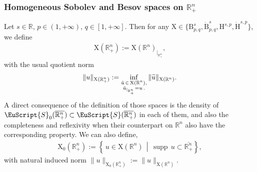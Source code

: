 \documentclass[AHL,Unicode,longabstracts,published]{cedram}
\DeclareMathOperator{\supp}{supp\,}
\newcommand{\bbR}{\mathbb{R}}
\newcommand{\rmH}{\mathrm{H}}%
\newcommand{\rmB}{\mathrm{B}}
\newcommand{\rmX}{\mathrm{X}}
\newcommand{\eus}{\EuScript}
\let\oldtilde\tilde
\renewcommand*{\tilde}[1]{\mathchoice{\widetilde{#1}}{\widetilde{#1}}{\oldtilde{#1}}{\oldtilde{#1}}}
\begin{document}
\subsubsection{Homogeneous Sobolev and Besov spaces on \texorpdfstring{$\bbR^n_+$}{Rn+}}\label{sec:FunctionSpacesRn+}


Let $s\in\bbR$, $p\in(1,+\infty)$, $q\in[1,+\infty]$. Then for any $\rmX \in\{\rmB^{s}_{p,q}, \dot{\rmB}^{s}_{p,q}, \rmH^{s,p}, \dot{\rmH}^{s,p}\}$, we define
\begin{align*}
\rmX (\bbR^n_+):= \rmX (\bbR^n)_{|_{\bbR^n_+}},
\end{align*}
with the usual quotient norm
\[
\| u \|_{\rmX (\bbR^n_+)}:= \inf\limits_{\substack{\Tilde{u}\,\in\,\rmX (\bbR^n),\\ \tilde{u}_{|_{\bbR^n_+}}=u\,.}} \| \Tilde{u} \|_{\rmX (\bbR^n)}. 
\]
A direct consequence of the definition of those spaces is the density of $\eus{S}_0(\overline{\bbR^n_+})\subset\eus{S}(\overline{\bbR^n_+})$ in each of them, and also the completeness and reflexivity when their counterpart on $\bbR^n$ also have the corresponding property. We can also define,
\begin{align*}
\rmX _0\left(\bbR^n_+\right):= \left\{\,u\in \rmX \left(\bbR^n\right) \,\middle|\, \supp u \subset \overline{\bbR^n_+} \right\},
\end{align*}
with natural induced norm $\| u \|_{\rmX _0(\bbR^n_+)}:= \| u \|_{\rmX (\bbR^n)}$.
\end{document}
